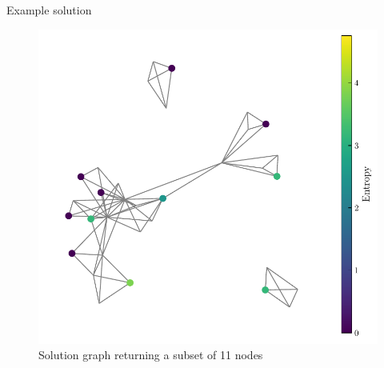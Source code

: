 \documentclass[handout]{beamer}
\begin{document}
\begin{frame}{Example solution}
    \begin{figure}
        \includegraphics[width=.6\textwidth]{../Figures/solutionGraph_pad.pdf}
        \caption{Solution graph returning a subset of 11 nodes}
    \end{figure}
\end{frame}
\end{document}
